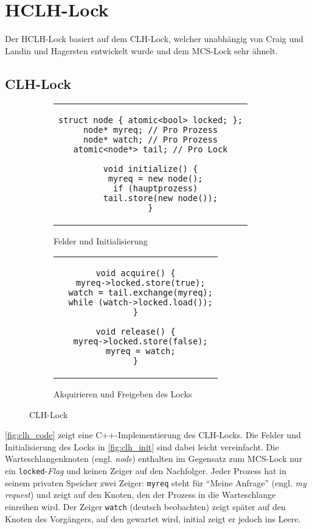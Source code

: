 \section{HCLH-Lock}
\label{sec:hclh-lock}

Der HCLH-Lock \cite{HCLH-Lock} basiert auf dem CLH-Lock,
welcher unabhängig von Craig \cite{C-Lock} und Landin und Hagersten \cite{LH-Lock} entwickelt wurde
und dem MCS-Lock sehr ähnelt.

\subsection{CLH-Lock}

\begin{figure}[h]
    \begin{subfigure}[b]{.5\textwidth}
        \centering
        \begin{tabular}{c}\begin{lstlisting}
struct node { atomic<bool> locked; };
node* myreq; // Pro Prozess
node* watch; // Pro Prozess
atomic<node*> tail; // Pro Lock

void initialize() {
  myreq = new node();
  if (hauptprozess)
    tail.store(new node());
}
        \end{lstlisting}\end{tabular}
        \caption{Felder und Initialisierung}
        \label{fig:clh_init}
    \end{subfigure}
    \begin{subfigure}[b]{.5\textwidth}
        \centering
        \begin{tabular}{c}\begin{lstlisting}
void acquire() {
  myreq->locked.store(true);
  watch = tail.exchange(myreq);
  while (watch->locked.load());
}

void release() {
  myreq->locked.store(false);
  myreq = watch;
}
        \end{lstlisting}\end{tabular}
        \caption{Akquirieren und Freigeben des Locks}
        \label{fig:clh_acq_rel}
    \end{subfigure}
    \caption{CLH-Lock}
    \label{fig:clh_code}
\end{figure}

\autoref{fig:clh_code} zeigt eine C++-Implementierung des CLH-Locks.
Die Felder und Initialisierung des Locks in \autoref{fig:clh_init} sind dabei leicht vereinfacht.
Die Warteschlangenknoten (engl. \textit{node}) enthalten im Gegensatz zum MCS-Lock nur ein \texttt{locked}-\textit{Flag}
und keinen Zeiger auf den Nachfolger.
Jeder Prozess hat in seinem privaten Speicher zwei Zeiger:
\texttt{myreq} steht für \enquote{Meine Anfrage} (engl. \textit{my request})
und zeigt auf den Knoten,
den der Prozess in die Warteschlange einreihen wird.
Der Zeiger \texttt{watch} (deutsch beobachten) zeigt später auf den Knoten des Vorgängers,
auf den gewartet wird,
initial zeigt er jedoch ins Leere.


